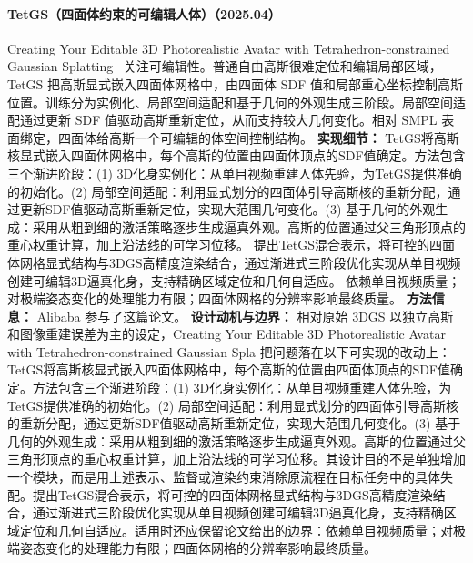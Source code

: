 \paragraph{TetGS（四面体约束的可编辑人体）（2025.04）}
Creating Your Editable 3D Photorealistic Avatar with Tetrahedron-constrained Gaussian Splatting~\cite{2504_20403} 关注可编辑性。普通自由高斯很难定位和编辑局部区域，TetGS 把高斯显式嵌入四面体网格中，由四面体 SDF 值和局部重心坐标控制高斯位置。训练分为实例化、局部空间适配和基于几何的外观生成三阶段。局部空间适配通过更新 SDF 值驱动高斯重新定位，从而支持较大几何变化。相对 SMPL 表面绑定，四面体给高斯一个可编辑的体空间控制结构。
\textbf{实现细节：} TetGS将高斯核显式嵌入四面体网格中，每个高斯的位置由四面体顶点的SDF值确定。方法包含三个渐进阶段：(1) 3D化身实例化：从单目视频重建人体先验，为TetGS提供准确的初始化。(2) 局部空间适配：利用显式划分的四面体引导高斯核的重新分配，通过更新SDF值驱动高斯重新定位，实现大范围几何变化。(3) 基于几何的外观生成：采用从粗到细的激活策略逐步生成逼真外观。高斯的位置通过父三角形顶点的重心权重计算，加上沿法线的可学习位移。 提出TetGS混合表示，将可控的四面体网格显式结构与3DGS高精度渲染结合，通过渐进式三阶段优化实现从单目视频创建可编辑3D逼真化身，支持精确区域定位和几何自适应。 依赖单目视频质量；对极端姿态变化的处理能力有限；四面体网格的分辨率影响最终质量。
\textbf{方法信息：} Alibaba 参与了这篇论文。
\textbf{设计动机与边界：} 相对原始 3DGS 以独立高斯和图像重建误差为主的设定，Creating Your Editable 3D Photorealistic Avatar with Tetrahedron-constrained Gaussian Spla 把问题落在以下可实现的改动上：TetGS将高斯核显式嵌入四面体网格中，每个高斯的位置由四面体顶点的SDF值确定。方法包含三个渐进阶段：(1) 3D化身实例化：从单目视频重建人体先验，为TetGS提供准确的初始化。(2) 局部空间适配：利用显式划分的四面体引导高斯核的重新分配，通过更新SDF值驱动高斯重新定位，实现大范围几何变化。(3) 基于几何的外观生成：采用从粗到细的激活策略逐步生成逼真外观。高斯的位置通过父三角形顶点的重心权重计算，加上沿法线的可学习位移。其设计目的不是单独增加一个模块，而是用上述表示、监督或渲染约束消除原流程在目标任务中的具体失配。提出TetGS混合表示，将可控的四面体网格显式结构与3DGS高精度渲染结合，通过渐进式三阶段优化实现从单目视频创建可编辑3D逼真化身，支持精确区域定位和几何自适应。适用时还应保留论文给出的边界：依赖单目视频质量；对极端姿态变化的处理能力有限；四面体网格的分辨率影响最终质量。
